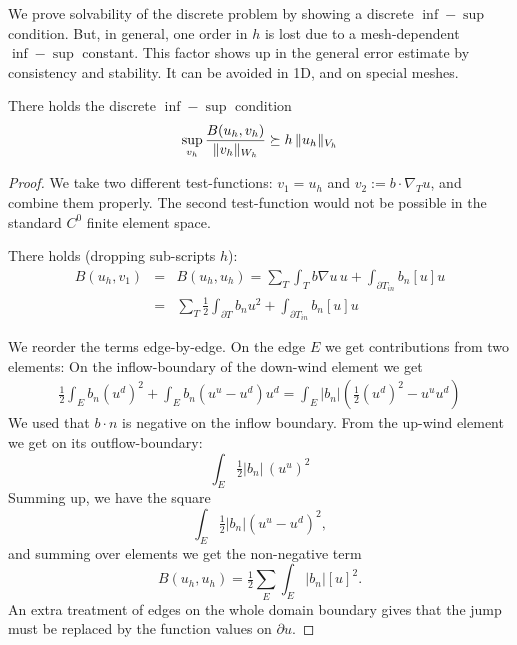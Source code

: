 We prove solvability of the discrete problem by showing a discrete
$\inf-\sup$ condition.  But, in general, one order in $h$ is lost due to a
mesh-dependent $\inf-\sup$ constant. This factor shows up in the
general error estimate by consistency and stability. It can be avoided
in 1D, and on special meshes. 

\begin{theorem} There holds the discrete $\inf-\sup$ condition
$$
\sup_{v_h} \frac{B(u_h, v_h)}{ \| v_h \|_{W_h}}  \succeq h \, \| u_h \|_{V_h}
$$
\end{theorem}
\begin{proof}
We take two different test-functions: $v_1 = u_h$ and $v_2 := b \cdot
\nabla_T u$, and combine them properly. The second test-function would not be possible in the
standard $C^0$ finite element space.

There holds (dropping sub-scripts $h$):
\begin{eqnarray*}
B(u_h, v_1) & = & B(u_h, u_h) = \sum_T \int_T b \nabla u \, u + \int_{\partial T_{in}}
  b_n [u] u \\
& = & \sum_T \frac{1}{2} \int_{\partial T} b_n u^2 + \int_{\partial T_{in}}
  b_n [u] u 
\end{eqnarray*}

We reorder the terms edge-by-edge. On the edge $E$ we get
contributions from two elements: On the inflow-boundary of the
down-wind element we get
\begin{eqnarray*}
\tfrac{1}{2} \int_E b_n (u^d)^2 + \int_E b_n (u^u - u^d) u^d = \int_E
  |b_n| \left( \tfrac{1}{2} (u^d)^2 - u^u u^d \right)
\end{eqnarray*}
We used that $b\cdot n$ is negative on the inflow boundary. From the
up-wind element we get on its outflow-boundary:
$$
\int_E \tfrac{1}{2} |b_n| \, (u^u)^2 
$$
Summing up, we have the square
$$
\int_E \tfrac{1}{2} | b_n |  (u^u  - u^d)^2,
$$
and summing over elements we get the non-negative term
$$
B(u_h, u_h) = \tfrac{1}{2} \sum_E \int_E |b_n| [u]^2.
$$
An extra treatment of edges on the whole domain boundary gives that
the jump must be  replaced by the function values on $\partial u$.


\end{proof}
